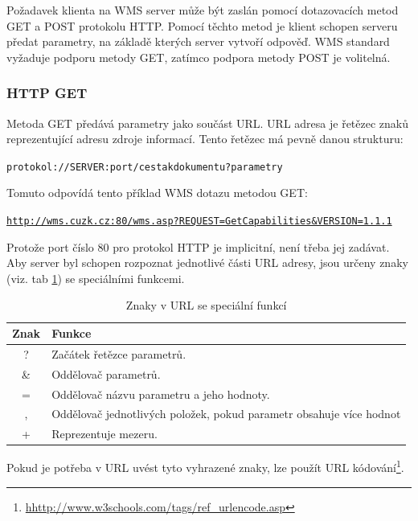 \documentclass[a4paper,12pt]{article}
\begin{document}
Požadavek klienta na WMS server může být zaslán pomocí dotazovacích metod GET a POST protokolu HTTP. Pomocí těchto metod je klient schopen
serveru předat parametry, na základě kterých server vytvoří odpověď. WMS standard vyžaduje podporu metody GET, zatímco podpora metody POST je volitelná. 

\subsubsection{HTTP GET}

Metoda GET předává parametry jako součást URL. URL adresa je řetězec znaků reprezentující adresu zdroje informací. Tento řetězec má pevně danou strukturu:
	
\begin{alltt}\footnotesize
	protokol://SERVER: port / cesta k dokumentu ? parametry
\end{alltt}
	
Tomuto odpovídá tento příklad WMS dotazu metodou GET:

\begin{alltt}\footnotesize
\url{http://wms.cuzk.cz:80/wms.asp?REQUEST=GetCapabilities&VERSION=1.1.1}
\end{alltt}

\newpage

Protože port číslo 80 pro protokol HTTP je implicitní, není třeba jej zadávat.   
Aby server byl schopen rozpoznat jednotlivé části URL adresy, jsou určeny znaky (viz. tab \ref{tab:myfirsttable}) se speciálními funkcemi.

\begin{table}[h]
\centering
\begin{tabular}{|c|l|}      \hline
  Znak      &    Funkce				\\ \hline
   ?        &  Začátek řetězce parametrů.      	\\ \hline
   \&       &  Oddělovač parametrů.   		\\ \hline
   =        &  Oddělovač názvu parametru a jeho hodnoty.    \\ \hline
   ,        &  Oddělovač jednotlivých položek, pokud parametr obsahuje více hodnot\\ \hline
   +        &  Reprezentuje mezeru. 	\\ \hline
\end{tabular}
\caption{Znaky v URL se speciální funkcí}
\label{tab:myfirsttable}
\end{table}

Pokud je potřeba v URL uvést tyto vyhrazené znaky, lze použít URL kódování\footnote{\url{hhttp://www.w3schools.com/tags/ref_urlencode.asp}}.
\end{document}

